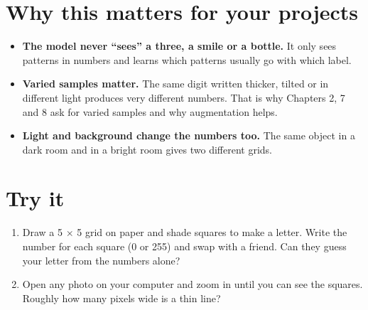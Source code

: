 \section{Why this matters for your projects}

\begin{itemize}
\item \textbf{The model never “sees” a three, a smile or a bottle.} It only sees patterns in numbers and learns which patterns usually go with which label.
\item \textbf{Varied samples matter.} The same digit written thicker, tilted or in different light produces very different numbers. That is why Chapters 2, 7 and 8 ask for varied samples and why augmentation helps.
\item \textbf{Light and background change the numbers too.} The same object in a dark room and in a bright room gives two different grids.
\end{itemize}

\section{Try it}

\begin{enumerate}
\item Draw a 5 \ensuremath{\times} 5 grid on paper and shade squares to make a letter. Write the number for each square (0 or 255) and swap with a friend. Can they guess your letter from the numbers alone?
\item Open any photo on your computer and zoom in until you can see the squares. Roughly how many pixels wide is a thin line?
\end{enumerate}

